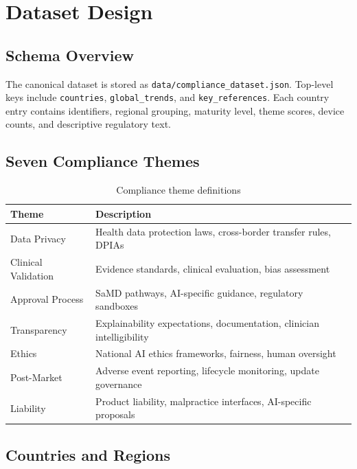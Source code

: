 \documentclass[12pt,a4paper]{report}
\begin{document}
\chapter{Dataset Design}
\label{ch:dataset}

\section{Schema Overview}

The canonical dataset is stored as \texttt{data/compliance\_dataset.json}. Top-level keys include \texttt{countries}, \texttt{global\_trends}, and \texttt{key\_references}. Each country entry contains identifiers, regional grouping, maturity level, theme scores, device counts, and descriptive regulatory text.

\section{Seven Compliance Themes}

\begin{table}[htbp]
  \centering
  \caption{Compliance theme definitions}
  \label{tab:themes}
  \begin{tabularx}{\textwidth}{@{}l X@{}}
    \toprule
    \textbf{Theme} & \textbf{Description} \\
    \midrule
    Data Privacy & Health data protection laws, cross-border transfer rules, DPIAs \\
    Clinical Validation & Evidence standards, clinical evaluation, bias assessment \\
    Approval Process & SaMD pathways, AI-specific guidance, regulatory sandboxes \\
    Transparency & Explainability expectations, documentation, clinician intelligibility \\
    Ethics & National AI ethics frameworks, fairness, human oversight \\
    Post-Market & Adverse event reporting, lifecycle monitoring, update governance \\
    Liability & Product liability, malpractice interfaces, AI-specific proposals \\
    \bottomrule
  \end{tabularx}
\end{table}

\section{Countries and Regions}
\end{document}

